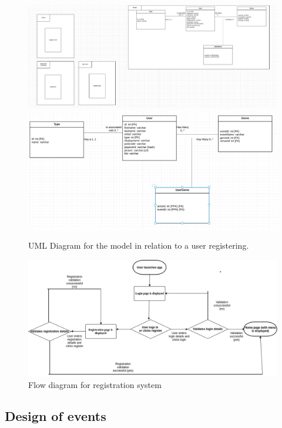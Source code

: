 \begin{figure}[H]
\includegraphics[width=\textwidth,height=\textheight,keepaspectratio]{images/register}
\includegraphics[width=\textwidth,height=\textheight,keepaspectratio]{images/users}
\caption{UML Diagram for the model in relation to a user registering.}
\end{figure}

\begin{figure}[H]
\includegraphics[width=\textwidth,height=\textheight,keepaspectratio]{images/flow}
\caption{Flow diagram for registration system}
\end{figure}



\subsection{Design of events}

